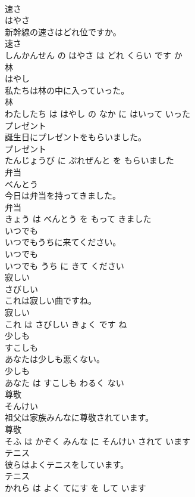 \documentclass[8pt]{extreport}
\begin{document}
\begin{CJK}{UTF8}{min}
\\	速さ	
\\	はやさ			
\\	新幹線の速さはどれ位ですか。	
\\	速さ 
\\	しんかんせん の はやさ は どれ くらい です か			
\\	林	
\\	はやし			
\\	私たちは林の中に入っていった。	
\\	林 
\\	わたしたち は はやし の なか に はいって いった			
\\	プレゼント	
\\	誕生日にプレゼントをもらいました。	
\\	プレゼント 
\\	たんじょうび に ぷれぜんと を もらいました			
\\	弁当	
\\	べんとう			
\\	今日は弁当を持ってきました。	
\\	弁当 
\\	きょう は べんとう を もって きました			
\\	いつでも	
\\	いつでもうちに来てください。	
\\	いつでも 
\\	いつでも うち に きて ください			
\\	寂しい	
\\	さびしい			
\\	これは寂しい曲ですね。	
\\	寂しい 
\\	これ は さびしい きょく です ね			
\\	少しも	
\\	すこしも			
\\	あなたは少しも悪くない。	
\\	少しも 
\\	あなた は すこしも わるく ない			
\\	尊敬	
\\	そんけい			
\\	祖父は家族みんなに尊敬されています。	
\\	尊敬 
\\	そふ は かぞく みんな に そんけい されて います			
\\	テニス	
\\	彼らはよくテニスをしています。	
\\	テニス 
\\	かれら は よく てにす を して います			

\end{CJK}
\end{document}
